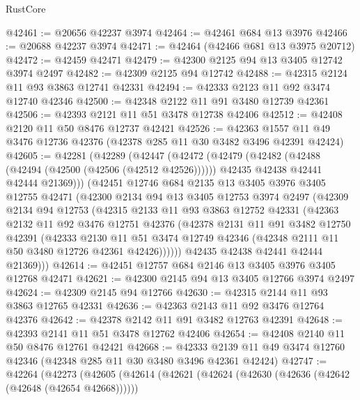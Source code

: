 \begin{lexlean}{RustCore}
\begin{coremodule}
@42461 := @20656 @42237 @3974
@42464 := @42461 @684 @13 @3976
@42466 := @20688 @42237 @3974
@42471 := @42464 (@42466 @681 @13 @3975 @20712)
@42472 := @42459 @42471
@42479 := @42300 @2125 @94 @13 @3405 @12742 @3974 @2497
@42482 := @42309 @2125 @94 @12742
@42488 := @42315 @2124 @11 @93 @3863 @12741 @42331
@42494 := @42333 @2123 @11 @92 @3474 @12740 @42346
@42500 := @42348 @2122 @11 @91 @3480 @12739 @42361
@42506 := @42393 @2121 @11 @51 @3478 @12738 @42406
@42512 := @42408 @2120 @11 @50 @8476 @12737 @42421
@42526 := @42363 @1557 @11 @49 @3476 @12736 @42376 (@42378 @285 @11 @30 @3482 @3496 @42391 @42424)
@42605 := @42281
    (@42289
      (@42447
        (@42472
          (@42479
            (@42482 (@42488 (@42494 (@42500 (@42506 (@42512 @42526))))))
            @42435
            @42438
            @42441
            @42444
            @21369)))
      (@42451
        @12746
        @684
        @2135
        @13
        @3405
        @3976
        @3405
        @12755
        @42471
        (@42300
          @2134
          @94
          @13
          @3405
          @12753
          @3974
          @2497
          (@42309
            @2134
            @94
            @12753
            (@42315
              @2133
              @11
              @93
              @3863
              @12752
              @42331
              (@42363
                @2132
                @11
                @92
                @3476
                @12751
                @42376
                (@42378
                  @2131
                  @11
                  @91
                  @3482
                  @12750
                  @42391
                  (@42333
                    @2130
                    @11
                    @51
                    @3474
                    @12749
                    @42346
                    (@42348 @2111 @11 @50 @3480 @12726 @42361 @42426))))))
          @42435
          @42438
          @42441
          @42444
          @21369)))
@42614 := @42451 @12757 @684 @2146 @13 @3405 @3976 @3405 @12768 @42471
@42621 := @42300 @2145 @94 @13 @3405 @12766 @3974 @2497
@42624 := @42309 @2145 @94 @12766
@42630 := @42315 @2144 @11 @93 @3863 @12765 @42331
@42636 := @42363 @2143 @11 @92 @3476 @12764 @42376
@42642 := @42378 @2142 @11 @91 @3482 @12763 @42391
@42648 := @42393 @2141 @11 @51 @3478 @12762 @42406
@42654 := @42408 @2140 @11 @50 @8476 @12761 @42421
@42668 := @42333 @2139 @11 @49 @3474 @12760 @42346 (@42348 @285 @11 @30 @3480 @3496 @42361 @42424)
@42747 := @42264
    (@42273
      (@42605
        (@42614
          (@42621
            (@42624 (@42630 (@42636 (@42642 (@42648 (@42654 @42668))))))

\end{coremodule}
\end{lexlean}
